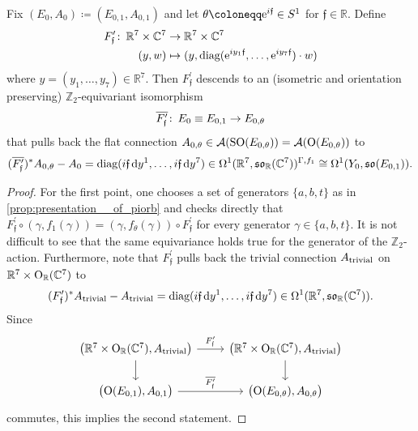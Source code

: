 \documentclass[11pt,a4paper]{scrartcl}
\newcommand*\diff{\mathop{}\!\textup{d}}
\newcommand{\col}{\colon \thinspace}
\newcommand{\e}{\textup{e}}
\newcommand{\SO}{\textup{SO}}
\renewcommand{\O}{\textup{O}}
\numberwithin{equation}{section}
\theoremstyle{plain}
\theoremstyle{definition}
\theoremstyle{remark}
\begin{document}
\begin{proposition}\label{prop:example18-identifying_flat_bundles-I}
Fix $(E_0,A_0) \coloneqq (E_{0,1}, A_{0,1})$ and let $\theta \coloneqq \e^{i \mathfrak{f}} \in S^1$ for $\mathfrak{f} \in \mathbb{R}$. Define 
\begin{align*}
F_{\mathfrak{f}}^\prime \col \mathbb{R}^7 \times \mathbb{C}^7 &\to \mathbb{R}^7 \times \mathbb{C}^7 \\
(y,w) &\mapsto (y , \textup{diag}(\e^{i y_1 \mathfrak{f}}, \dots, \e^{i y_7 \mathfrak{f}} ) \cdot w)
\end{align*} 
where $y=(y_1,\dots,y_7) \in \mathbb{R}^7$. Then $F_{\mathfrak{f}}^\prime$ descends to an (isometric and orientation preserving) $\mathbb{Z}_2$-equivariant isomorphism \[\overline{F_{\mathfrak{f}}^\prime} \col E_{0}\equiv E_{0,1} \to E_{0,\theta}\] that pulls back the flat connection $A_{0,\theta} \in \mathcal{A}(\SO(E_{0,\theta})) = \mathcal{A}(\O(E_{0,\theta}))$ to \[(\overline{F_{\mathfrak{f}}^\prime})^*A_{0,\theta} - A_{0} = \textup{diag} (i \mathfrak{f} \diff y^1, \dots , i \mathfrak{f} \diff y^7) \in \Omega^1(\mathbb{R}^7, \mathfrak{so}_{\mathbb{R}}(\mathbb{C}^7))^{\Gamma,f_1} \cong \Omega^1(Y_0,\mathfrak{so}(E_{0,1})).\] 
\end{proposition}
\begin{proof}
For the first point, one chooses a set of generators $\{a,b,t\}$ as in \autoref{prop:presentation__of_piorb} and checks directly that $F_{\mathfrak{f}}^\prime \circ (\gamma, f_1(\gamma)) = (\gamma, f_\theta(\gamma)) \circ F_{\mathfrak{f}}^\prime$ for every generator $\gamma \in \{a,b,t \}$. It is not difficult to see that the same equivariance holds true for the generator of the $\mathbb{Z}_2$-action. Furthermore, note that $F_{\mathfrak{f}}^\prime$ pulls back the trivial connection $A_{\textup{trivial}}$ on $\mathbb{R}^7\times \O_{\mathbb{R}}(\mathbb{C}^7)$ to \[ (F_{\mathfrak{f}}^\prime)^* A_{\textup{trivial}} - A_{\textup{trivial}} = \textup{diag}(i\mathfrak{f} \diff y^1 ,\dots , i\mathfrak{f} \diff y^7) \in \Omega^1(\mathbb{R}^7,\mathfrak{so}_{\mathbb{R}}(\mathbb{C}^7)). \] Since 
\begin{equation*}
\begin{tikzcd}
\big(\mathbb{R}^7 \times \O_{\mathbb{R}}(\mathbb{C}^7),A_{\textup{trivial}}\big) \arrow[r, "F_{\mathfrak{f}}^\prime"] \arrow[d] & \big(\mathbb{R}^7 \times \O_{\mathbb{R}}(\mathbb{C}^7),A_{\textup{trivial}}\big) \arrow[d] \\
\big(\O(E_{0,1}),A_{0,1}\big) \arrow[r, "\overline{F_{\mathfrak{f}}^\prime}"] & \big(\O(E_{0,\theta}),A_{0,\theta}\big)
\end{tikzcd}
\end{equation*} commutes, this implies the second statement.
\end{proof}
\end{document}
